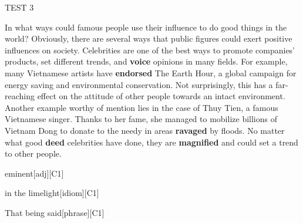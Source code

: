 \begin{glossarymc}[Cambridge 15]
\begin{test}{TEST 3}
    \begin{qa}{In what ways could famous people use their influence to do good things in the world?}
    Obviously, there are several ways that public figures could exert positive influences on society. Celebrities are one of the best ways to promote companies’ products, set different trends, and \textbf{voice} opinions in many fields. For example, many Vietnamese artists have \textbf{endorsed} The Earth Hour, a global campaign for energy saving and environmental conservation. Not surprisingly, this has a far-reaching effect on the attitude of other people towards an intact environment. Another example worthy of mention lies in the case of Thuy Tien, a famous Vietnamese singer. Thanks to her fame, she managed to mobilize billions of Vietnam Dong to donate to the needy in areas \textbf{ravaged} by floods. No matter what good \textbf{deed} celebrities have done, they are \textbf{magnified} and could set a trend to other people.
    \end{qa}

        \begin{VocabExplain}[Part 3]
            \begin{ExplainCard}{eminent}[adj][C1]
            \end{ExplainCard}
            \begin{ExplainCard}{in the limelight}[idiom][C1]
            \end{ExplainCard}

            \begin{ExplainCard}{That being said}[phrase][C1]
            \end{ExplainCard}


\end{VocabExplain}
\end{test}
\end{glossarymc}

